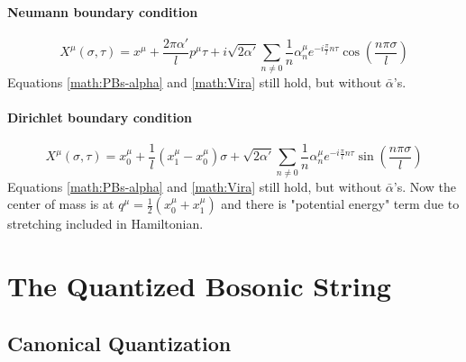 \documentclass[12pt, a4paper, DIV=15]{article}
\numberwithin{equation}{section}
\begin{document}
\paragraph{Neumann boundary condition}
\begin{equation}
	X^\mu (\sigma, \tau) = x^\mu + \frac{2\pi \alpha'}{l} p^\mu \tau + i \sqrt{2\alpha'} \sum_{n\neq 0} \frac{1}{n} \alpha^\mu_n e^{-i\frac{\pi }{l} n \tau} \cos(\frac{n\pi \sigma}{l})
\end{equation}
Equations \eqref{math:PBs-alpha} and \eqref{math:Vira} still hold, but without $\bar\alpha$'s.

\paragraph{Dirichlet boundary condition}
\begin{equation}
	X^\mu (\sigma, \tau) = x_0^\mu + \frac{1}{l} (x_1^\mu - x_0^\mu)\sigma + \sqrt{2\alpha'} \sum_{n\neq 0} \frac{1}{n} \alpha^\mu_n e^{-i\frac{\pi }{l} n \tau} \sin(\frac{n\pi \sigma}{l})
\end{equation}
Equations \eqref{math:PBs-alpha} and \eqref{math:Vira} still hold, but without $\bar\alpha$'s. Now the center of mass is at $q^\mu = \frac{1}{2}(x_0^\mu + x_1^\mu)$ and there is "potential energy" term due to stretching included in Hamiltonian.

\section{The Quantized Bosonic String}
\subsection{Canonical Quantization}
\end{document}
